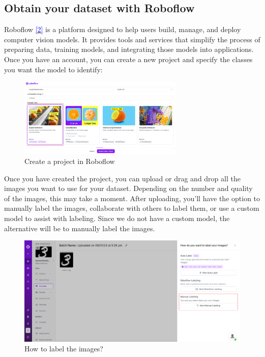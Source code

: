 \documentclass[../main]{subfiles}
\begin{document}
\subsection{Obtain your dataset with Roboflow}
Roboflow \hyperlink{target:zona}{\textcolor{blue}{[2]}} is a platform designed to help users build, manage, and deploy computer vision models. It provides tools and services that simplify the process of preparing data, training models, and integrating those models into applications. Once you have an account, you can create a new project and specify the classes you want the model to identify: 
\begin{figure}[H]
   \centering
   \includegraphics[width=0.7\textwidth]{./figures/roboflowProject}
   \caption{Create a project in Roboflow}
 \label{fig:red}
\end{figure}
Once you have created the project, you can upload or drag and drop all the images you want to use for your dataset. Depending on the number and quality of the images, this may take a moment. After uploading, you'll have the option to manually label the images, collaborate with others to label them, or use a custom model to assist with labeling. Since we do not have a custom model, the alternative will be to manually label the images.
\begin{figure}[H]
    \centering
    \includegraphics[width=1\textwidth]{./figures/label}
    \caption{How to label the images?}
    \label{fig:red}
\end{figure}
\end{document}
